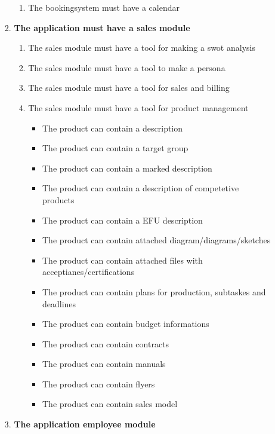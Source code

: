 \begin{enumerate}
\begin{enumerate}
\begin{enumerate}
\begin{enumerate}
                \item The bookingsystem must have a calendar
            \end{enumerate}
            \item \textbf{The application must have a sales module}
            \begin{enumerate}
                \item The sales module must have a tool for making a swot analysis
                \item The sales module must have a tool to make a persona
                \item The sales module must have a tool for sales and billing
                \item The sales module must have a tool for product management
                \begin{itemize}\textbf{\textit{skal skrives om til flydende tekst}}
                    \item The product can contain a description
                    \item The product can contain a target group
                    \item The product can contain a marked description
                    \item The product can contain a description of competetive products
                    \item The product can contain a EFU description
                    \item The product can contain attached diagram/diagrams/sketches
                    \item The product can contain attached files with acceptianes/certifications
                    \item The product can contain plans for production, subtaskes and deadlines
                    \item The product can contain budget informations
                    \item The product can contain contracts
                    \item The product can contain manuals
                    \item The product can contain flyers
                    \item The product can contain sales model
                \end{itemize}
            \end{enumerate}
            \item \textbf{The application employee module}

\end{enumerate}
\end{enumerate}
\end{enumerate}
